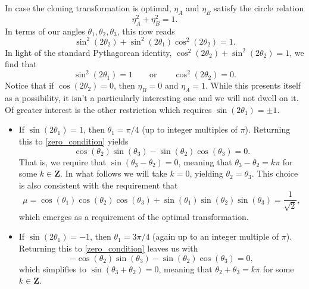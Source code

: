 \documentclass[reqno]{amsart}
\numberwithin{lemma}{section}
\numberwithin{proposition}{section}
\newcommand{\Z}{\mathbf{Z}}
\begin{document}
{In case the cloning transformation is optimal, $\eta_{A}$ and $\eta_{B}$ satisfy the circle relation
\begin{equation*}
\eta_{A}^{2} + \eta_{B}^{2} = 1.
\end{equation*}
In terms of our angles $\theta_{1}, \theta_{2}, \theta_{3}$, this now reads
\begin{equation*}
\sin^{2}(2 \theta_{2}) + \sin^{2}(2 \theta_{1}) \cos^{2}(2 \theta_{2}) = 1.
\end{equation*}
In light of the standard Pythagorean identity, $\cos^{2}(2 \theta_{2}) + \sin^{2}(2 \theta_{2}) = 1$, we find that
\begin{equation*}
\sin^{2}(2 \theta_{1}) = 1 \qquad \text{or} \qquad \cos^{2}(2 \theta_{2}) = 0. 
\end{equation*}
Notice that if $\cos(2 \theta_{2}) = 0$, then $\eta_{B} = 0$ and $\eta_{A} = 1$. While this presents itself as a possibility, it isn't a particularly interesting one and we will not dwell on it. Of greater interest is the other restriction which requires $\sin(2\theta_{1}) = \pm 1$.
\begin{itemize}
\item If $\sin(2 \theta_{1}) = 1$, then $\theta_{1} = \pi/4$ (up to integer multiples of $\pi$). Returning this to \eqref{zero_condition} yields
\begin{equation*}
\cos(\theta_{2}) \sin(\theta_{3}) - \sin(\theta_{2}) \cos(\theta_{3}) = 0.
\end{equation*}
That is, we require that $\sin(\theta_{3} - \theta_{2}) = 0$, meaning that $\theta_{3} - \theta_{2} = k\pi$ for some $k \in \Z$. In what follows we will take $k = 0$, yielding $\theta_{2} = \theta_{3}$. This choice is also consistent with the requirement that
\begin{equation*}
\mu = \cos(\theta_{1}) \cos(\theta_{2}) \cos(\theta_{3}) + \sin(\theta_{1}) \sin(\theta_{2}) \sin(\theta_{3}) = \frac{1}{\sqrt{2}},
\end{equation*}
which emerges as a requirement of the optimal transformation.
\item If $\sin(2\theta_{1}) = -1$, then $\theta_{1} = 3\pi/4$ (again up to an integer multiple of $\pi$). Returning this to \eqref{zero_condition} leaves us with
\begin{equation*}
-\cos(\theta_{2}) \sin(\theta_{3}) - \sin(\theta_{2}) \cos(\theta_{3}) = 0,
\end{equation*}
which simplifies to $\sin(\theta_{3} + \theta_{2}) = 0$, meaning that $\theta_{2} + \theta_{3} = k\pi$ for some $k \in \Z$. {}
\end{itemize}

}
\end{document}

